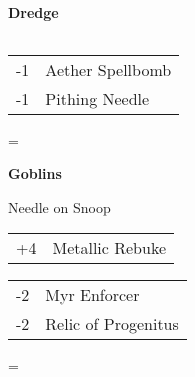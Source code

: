 \documentclass[fontsize=12pt,paper=a4]{scrartcl}
\newenvironment{absolutelynopagebreak}
  {\par\nobreak\vfil\penalty0\vfilneg
   \vtop\bgroup}
  {\par\xdef\tpd{\the\prevdepth}\egroup
   \prevdepth=\tpd}
\newenvironment{decklist}{%
    \begin{tabular}{>{\hspace{-4pt}}r<{\hspace{-3pt}}>{\hspace{-3pt}}l<{\hspace{-4pt}}}
    }{%
    \end{tabular}
    \par
}
\newcommand{\card}[2]{#1 & #2\\}
\newenvironment{sideboardguide}{%
    \newpage
    \begin{multicols}{4}
        \begin{tiny}
        }{%
        \end{tiny}
    \end{multicols}
}
\newenvironment{matchup}[1]{%
    \begin{absolutelynopagebreak}
        \textbf{#1}\par
    }{%
    \end{absolutelynopagebreak}
    \par\vspace{2em}
}
\newenvironment{notes}{%
}{%
    \par
}
\begin{document}
\begin{sideboardguide}
\begin{matchup}{Dredge}
\begin{decklist}
        \end{decklist}
        \begin{decklist}
            \card{-1}{Aether Spellbomb}
            \card{-1}{Pithing Needle}
        \end{decklist}
    \end{matchup}
    \begin{matchup}{Goblins}
        \begin{notes}
            Needle on Snoop
        \end{notes}
        \begin{decklist}
            \card{+4}{Metallic Rebuke}
        \end{decklist}
        \begin{decklist}
            \card{-2}{Myr Enforcer}
            \card{-2}{Relic of Progenitus}
        \end{decklist}
    \end{matchup}
\end{sideboardguide}
\end{document}
